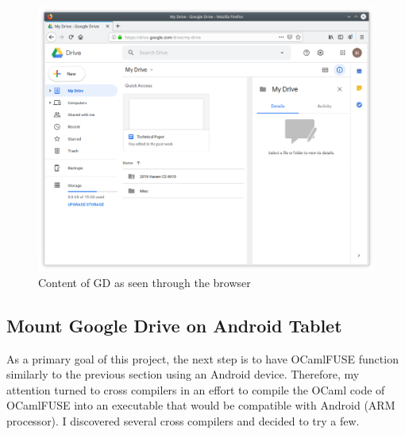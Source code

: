 \begin{enumerate}
\begin{figure}[htb]
  \includegraphics[scale=0.4]{images/ocaml10.png}
  \caption{Content of GD as seen through the browser} %
  \label{fig:ocaml10}
\end{figure}
\end{enumerate}
\subsection{Mount Google Drive on Android Tablet}
As a primary goal of this project, the next step is to have OCamlFUSE function similarly to the previous section using an Android device. Therefore, my attention turned to cross compilers in an effort to compile the OCaml code of OCamlFUSE into an executable that would be compatible with Android (ARM processor). I discovered several cross compilers and decided to try a few.
